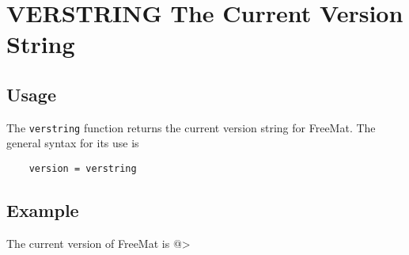 \section{VERSTRING The Current Version String}

\subsection{Usage}

The \verb|verstring| function returns the current version string for
FreeMat.  The general syntax for its use is
\begin{verbatim}
    version = verstring
\end{verbatim}
\subsection{Example}

The current version of FreeMat is
@>

